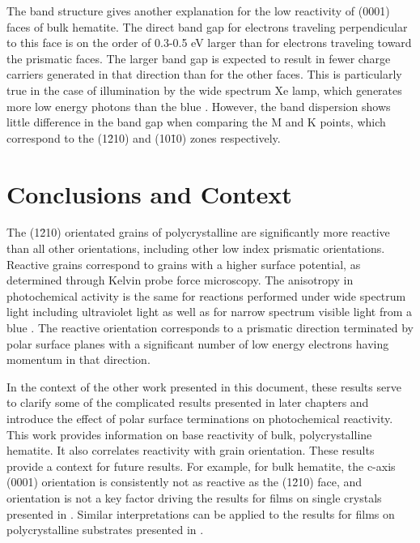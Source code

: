 The band structure gives another explanation for the low reactivity of (0001) faces of
bulk hematite. The direct band gap for electrons traveling perpendicular to this face is
on the order of 0.3-0.5 \si{\electronvolt} larger than for electrons traveling toward the
prismatic faces. The larger band gap is expected to result in fewer charge carriers
generated in that direction than for the other faces. This is particularly true in the
case of illumination by the wide spectrum Xe lamp, which generates more low energy photons
than the blue . However, the band dispersion shows little difference in the band
gap when comparing the M and K points, which correspond to the (1\={2}10) and (10\={1}0)
zones respectively.



\section{Conclusions and Context}\label{sec:ch9conclusion} 

The (1\={2}10) orientated grains of polycrystalline  are significantly more
reactive than all other orientations, including other low index prismatic orientations.
Reactive grains correspond to grains with a higher surface potential, as determined
through Kelvin probe force microscopy. The anisotropy in photochemical activity is the
same for reactions performed under wide spectrum light including ultraviolet light as well
as for narrow spectrum visible light from a blue . The reactive orientation
corresponds to a prismatic direction terminated by polar surface planes with a significant
number of low energy electrons having momentum in that direction. 

In the context of the other work presented in this document, these results serve to
clarify some of the complicated results presented in later chapters and introduce the
effect of polar surface terminations on photochemical reactivity. This work provides 
information on base reactivity of bulk, polycrystalline hematite. It also correlates
reactivity with grain orientation. These results provide a context for future results. 
For example, for bulk hematite, the c-axis (0001) orientation is consistently not as 
reactive as the (1\={2}10) face, and orientation is not a key factor driving the results 
for films on single crystals presented in . Similar 
interpretations can be applied to the results for films on polycrystalline substrates 
presented in . 